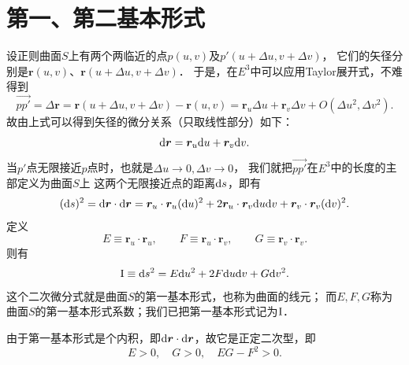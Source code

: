 \section{第一、第二基本形式}
设正则曲面$S$上有两个两临近的点$p(u,v)$及$p'(u+\Delta u, v+\Delta v)$，
它们的矢径分别是$\boldsymbol{r}(u,v)$、$\boldsymbol{r}(u+\Delta u, v+\Delta v)$．
于是，在$E^3$中可以应用Taylor展开式，不难得到
\begin{equation*}
    \overrightarrow{pp'}=\Delta \boldsymbol{r} =\boldsymbol{r}(u+\Delta u, v+\Delta v) - \boldsymbol{r}(u,v)
    = \boldsymbol{r}_u \Delta u + \boldsymbol{r}_v \Delta v + O(\Delta u^2, \Delta v^2).
\end{equation*}
故由上式可以得到矢径的微分关系（只取线性部分）如下：
\begin{equation}\label{chcdg:eqn_drdudv}
    {\rm d} \boldsymbol{r} = \boldsymbol{r}_u {\rm d} u + \boldsymbol{r}_v {\rm d} v .
\end{equation}
当$p'$点无限接近$p$点时，也就是$\Delta u\to 0, \Delta v\to 0$，
我们就把$\overrightarrow{pp'}$在$E^3$中的长度的主部定义为曲面$S$上
这两个无限接近点的距离${\rm d}s$，即有
\begin{equation*}
    ({\rm d}s)^2 = {\rm d}\boldsymbol{r}\cdot {\rm d}\boldsymbol{r}
    = \boldsymbol{r}_u\cdot\boldsymbol{r}_u ({\rm d}u)^2 +2\boldsymbol{r}_u\cdot\boldsymbol{r}_v {\rm d}u {\rm d}v
    + \boldsymbol{r}_v\cdot\boldsymbol{r}_v ({\rm d}v)^2.
\end{equation*}
定义
\begin{equation}
    E\equiv \boldsymbol{r}_u\cdot\boldsymbol{r}_u, \qquad
    F\equiv \boldsymbol{r}_u\cdot\boldsymbol{r}_v, \qquad
    G\equiv \boldsymbol{r}_v\cdot\boldsymbol{r}_v .
\end{equation}
则有
\begin{equation}\label{chcdg:eqn_Iform}
    {\rm I}\equiv {\rm d}s^2 = E {\rm d}u^2 + 2 F {\rm d}u {\rm d}v + G {\rm d}v^2.
\end{equation}
这个二次微分式就是曲面$S$的{\heiti 第一基本形式}，也称为曲面的{\heiti 线元}；
而$E,F,G$称为曲面$S$的{\heiti 第一基本形式系数}；我们已把第一基本形式记为${\rm I}$．

由于第一基本形式是个内积，即${\rm d}\boldsymbol{r}\cdot {\rm d}\boldsymbol{r}$，故它是正定二次型，即
\begin{equation}
    E>0,\quad G>0,\quad  EG -F^2 >0 .
\end{equation}

